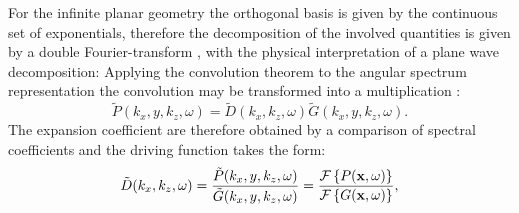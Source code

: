 For the infinite planar geometry the orthogonal basis is given by the continuous set of exponentials, therefore the decomposition of the involved quantities is given by a double Fourier-transform \cite{Ahrens2012, Arfken2005,Schultz2014:Comparing_approaches}, with the physical interpretation of a plane wave decomposition:
Applying the convolution theorem to the angular spectrum representation the convolution may be transformed into a multiplication \cite{Girod2001}:
\begin{equation}
\tilde{P}(k_x,y,k_z, \omega) = \tilde{D}(k_x,k_z, \omega)  \tilde{G}(k_x,y,k_z, \omega).
\end{equation}
%
%
%
The expansion coefficient are therefore obtained by a comparison of spectral coefficients and the driving function takes the form:
\begin{equation}
\tilde{D}(k_x,k_z,\omega) = \frac{\tilde{P}(k_x,y,k_z, \omega)}{ \tilde{G}(k_x,y,k_z, \omega)} = 
\frac{\mathcal{F}\left\{ P(\mathbf{x},\omega) \right\} }
{  \mathcal{F}\left\{ G(\mathbf{x},\omega) \right\} },
\end{equation}
